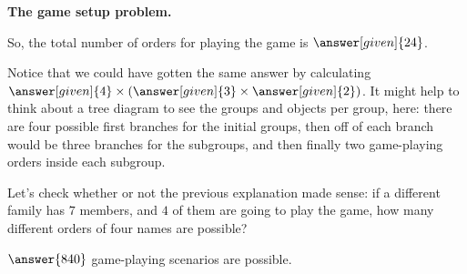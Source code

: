 \documentclass{ximera}
\begin{document}
\begin{question}{\bf The game setup problem.}
\begin{explanation}
So, the total number of orders for playing the game is $\answer[given]{24}$.
 
Notice that we could have gotten the same answer by calculating $\answer[given]{4} \times \left ( \answer[given]{3} \times \answer[given]{2} \right )$. It might help to think about a tree diagram to see the groups and objects per group, here: there are four possible first branches for the initial groups, then off of each branch would be three branches for the subgroups, and then finally two game-playing orders inside each subgroup.
\end{explanation}
\end{question}

\begin{question}
Let's check whether or not the previous explanation made sense: if a different family has $7$ members, and $4$ of them are going to play the game, how many different orders of four names are possible?

\begin{prompt}
$\answer{840}$ game-playing scenarios are possible.
\end{prompt}
\end{question}
\end{document}
